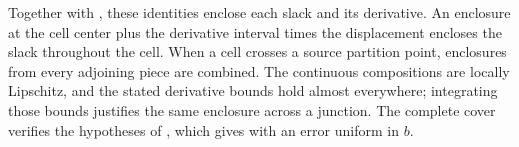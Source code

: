 \documentclass[11pt]{article}
\theoremstyle{definition}
\begin{document}
Together with , these identities enclose each slack and its derivative. An enclosure at the cell center plus the derivative interval times the displacement encloses the slack throughout the cell. When a cell crosses a source partition point, enclosures from every adjoining piece are combined. The continuous compositions are locally Lipschitz, and the stated derivative bounds hold almost everywhere; integrating those bounds justifies the same enclosure across a junction. The complete cover verifies the hypotheses of , which gives  with an error uniform in $b$.
\end{document}
